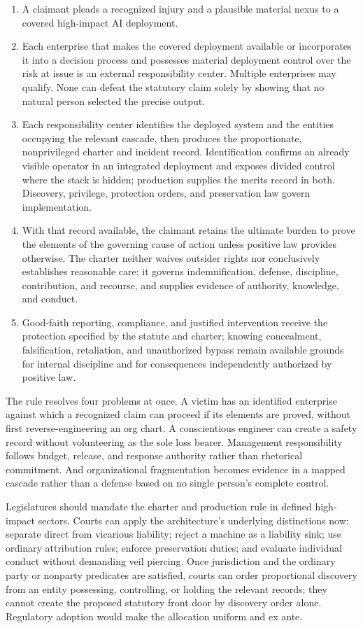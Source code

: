 \begin{enumerate}[leftmargin=2.2em]
\item A claimant pleads a recognized injury and a plausible material nexus to a covered high-impact AI deployment.
\item Each enterprise that makes the covered deployment available or incorporates it into a decision process and possesses material deployment control over the risk at issue is an external responsibility center. Multiple enterprises may qualify. None can defeat the statutory claim solely by showing that no natural person selected the precise output.
\item Each responsibility center identifies the deployed system and the entities occupying the relevant cascade, then produces the proportionate, nonprivileged charter and incident record. Identification confirms an already visible operator in an integrated deployment and exposes divided control where the stack is hidden; production supplies the merits record in both. Discovery, privilege, protection orders, and preservation law govern implementation.
\item With that record available, the claimant retains the ultimate burden to prove the elements of the governing cause of action unless positive law provides otherwise. The charter neither waives outsider rights nor conclusively establishes reasonable care; it governs indemnification, defense, discipline, contribution, and recourse, and supplies evidence of authority, knowledge, and conduct.
\item Good-faith reporting, compliance, and justified intervention receive the protection specified by the statute and charter; knowing concealment, falsification, retaliation, and unauthorized bypass remain available grounds for internal discipline and for consequences independently authorized by positive law.
\end{enumerate}

The rule resolves four problems at once. A victim has an identified enterprise against which a recognized claim can proceed if its elements are proved, without first reverse-engineering an org chart. A conscientious engineer can create a safety record without volunteering as the sole loss bearer. Management responsibility follows budget, release, and response authority rather than rhetorical commitment. And organizational fragmentation becomes evidence in a mapped cascade rather than a defense based on no single person's complete control.

Legislatures should mandate the charter and production rule in defined high-impact sectors. Courts can apply the architecture's underlying distinctions now: separate direct from vicarious liability; reject a machine as a liability sink; use ordinary attribution rules; enforce preservation duties; and evaluate individual conduct without demanding veil piercing. Once jurisdiction and the ordinary party or nonparty predicates are satisfied, courts can order proportional discovery from an entity possessing, controlling, or holding the relevant records; they cannot create the proposed statutory front door by discovery order alone. Regulatory adoption would make the allocation uniform and ex ante.

